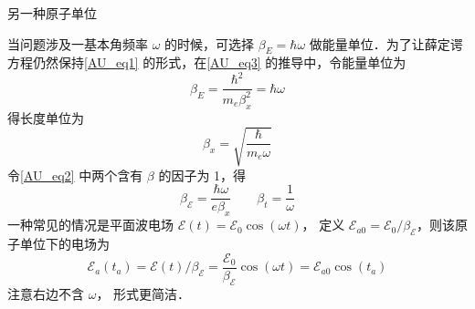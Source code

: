 \begin{exam}{另一种原子单位}

当问题涉及一基本角频率 $\omega$ 的时候，可选择 $\beta_E = \hbar\omega$ 做能量单位．为了让薛定谔方程仍然保持\autoref{AU_eq1} 的形式，在\autoref{AU_eq3} 的推导中，令能量单位为
\begin{equation}
\beta_E = \frac{\hbar^2}{m_e\beta_x^2}=\hbar\omega
\end{equation}
得长度单位为
\begin{equation}
\beta_x = \sqrt{\frac{\hbar}{m_e\omega}}
\end{equation}
令\autoref{AU_eq2} 中两个含有 $\beta$ 的因子为 1，得
\begin{equation}
\beta_\mathcal{E} = \frac{\hbar\omega}{e \beta_x} \qquad \beta_t = \frac{1}{\omega}
\end{equation}
一种常见的情况是平面波电场 $\mathcal{E}(t) = \mathcal{E}_0\cos(\omega t)$， 定义 $\mathcal{E}_{a0} = \mathcal{E}_0/\beta_\mathcal{E}$，则该原子单位下的电场为
\begin{equation}
\mathcal{E}_a(t_a) = \mathcal{E}(t)/\beta_\mathcal{E} =
\frac{\mathcal{E}_{0}}{\beta_\mathcal{E}}\cos(\omega t) = \mathcal{E}_{a0}\cos(t_a)
\end{equation}
注意右边不含 $\omega$， 形式更简洁．
\end{exam}



